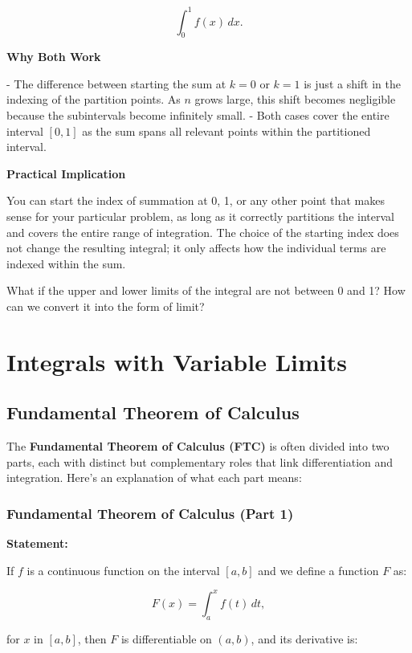 \documentclass[a4paper,12pt]{book}
\begin{document}
\[
\int_0^1 f(x) \, dx.
\]

\textbf{Why Both Work}

- The difference between starting the sum at \(k = 0\) or \(k = 1\) is just a shift in the indexing of the partition points. As \(n\) grows large, this shift becomes negligible because the subintervals become infinitely small.
- Both cases cover the entire interval \([0, 1]\) as the sum spans all relevant points within the partitioned interval.

\textbf{Practical Implication}

You can start the index of summation at 0, 1, or any other point that makes sense for your particular problem, as long as it correctly partitions the interval and covers the entire range of integration. The choice of the starting index does not change the resulting integral; it only affects how the individual terms are indexed within the sum.

\begin{bluebox}
What if the upper and lower limits of the integral are not between 0 and 1? How can we convert it into the form of limit?
\end{bluebox}



\chapter{Integrals with Variable Limits}

\section{Fundamental Theorem of Calculus}

The \textbf{Fundamental Theorem of Calculus (FTC)} is often divided into two parts, each with distinct but complementary roles that link differentiation and integration. Here's an explanation of what each part means:

\subsection{Fundamental Theorem of Calculus (Part 1)}

\textbf{Statement:}

If \( f \) is a continuous function on the interval \([a, b]\) and we define a function \( F \) as:

\[
F(x) = \int_{a}^{x} f(t) \, dt,
\]

for \( x \) in \([a, b]\), then \( F \) is differentiable on \((a, b)\), and its derivative is:
\end{document}
